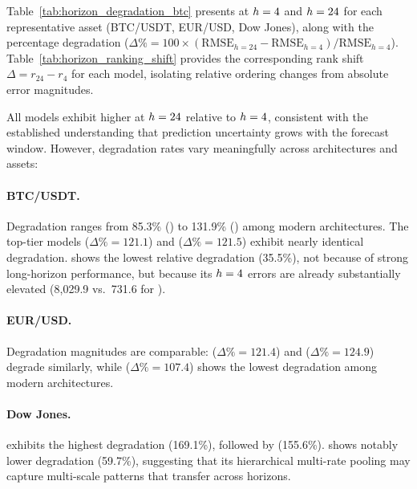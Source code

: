 Table~\ref{tab:horizon_degradation_btc} presents \rmse at $h=4$ and $h=24$ for each representative asset (BTC/USDT, EUR/USD, Dow Jones), along with the percentage degradation ($\Delta\% = 100 \times (\text{RMSE}_{h=24} - \text{RMSE}_{h=4}) / \text{RMSE}_{h=4}$).  Table~\ref{tab:horizon_ranking_shift} provides the corresponding rank shift $\Delta = r_{24} - r_4$ for each model, isolating relative ordering changes from absolute error magnitudes.



All models exhibit higher \rmse at $h=24$ relative to $h=4$, consistent with the established understanding that prediction uncertainty grows with the forecast window.  However, degradation rates vary meaningfully across architectures and assets:

\paragraph{BTC/USDT.}
Degradation ranges from 85.3\% (\nhits) to 131.9\% (\timesnet) among modern architectures.  The top-tier models \moderntcn ($\Delta\% = 121.1$) and \patchtst ($\Delta\% = 121.5$) exhibit nearly identical degradation.  \lstm shows the lowest relative degradation (35.5\%), not because of strong long-horizon performance, but because its $h=4$ errors are already substantially elevated (8{,}029.9 vs.\ 731.6 for \moderntcn).

\paragraph{EUR/USD.}
Degradation magnitudes are comparable: \moderntcn ($\Delta\% = 121.4$) and \patchtst ($\Delta\% = 124.9$) degrade similarly, while \nhits ($\Delta\% = 107.4$) shows the lowest degradation among modern architectures.

\paragraph{Dow Jones.}
\timesnet exhibits the highest degradation (169.1\%), followed by \autoformer (155.6\%).  \nhits shows notably lower degradation (59.7\%), suggesting that its hierarchical multi-rate pooling may capture multi-scale patterns that transfer across horizons.

